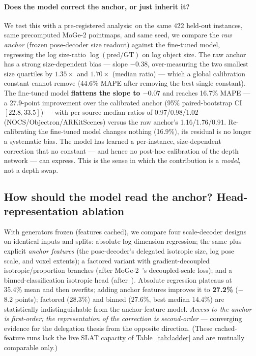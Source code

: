 \documentclass[runningheads]{llncs}
\begin{document}
\paragraph{Does the model correct the anchor, or just inherit it?}
We test this with a pre-registered analysis: on the same 422 held-out instances, same
precomputed MoGe-2 pointmaps, and same seed, we compare the \emph{raw anchor} (frozen
pose-decoder size readout) against the fine-tuned model, regressing the log size-ratio
$\log(\text{pred}/\text{GT})$ on log object size. The raw anchor has a strong
size-dependent bias --- slope $-0.38$, over-measuring the two smallest size quartiles by
$1.35\times$ and $1.70\times$ (median ratio) --- which a global calibration constant cannot
remove (44.6\% MAPE after removing the best single constant). The fine-tuned model
\textbf{flattens the slope to $-0.07$} and reaches 16.7\% MAPE --- a 27.9-point
improvement over the calibrated anchor (95\% paired-bootstrap CI $[22.8, 33.5]$) --- with
per-source median ratios of 0.97/0.98/1.02 (NOCS/Objectron/ARKitScenes) versus the raw
anchor's 1.16/1.76/0.91. Re-calibrating the fine-tuned model changes nothing (16.9\%),
\ie its residual is no longer a systematic bias. The model has learned a per-instance,
size-dependent correction that no constant --- and hence no post-hoc calibration of the
depth network --- can express. This is the sense in which the contribution is a
\emph{model}, not a depth swap.

\subsection{How should the model read the anchor? Head-representation ablation}
\label{sec:headablation}

With generators frozen (features cached), we compare four scale-decoder designs on
identical inputs and splits: absolute log-dimension regression; the same plus explicit
\emph{anchor features} (the pose-decoder's delegated isotropic size, log pose scale, and
voxel extents); a factored variant with gradient-decoupled isotropic/proportion branches
(after MoGe-2~\cite{moge2}'s decoupled-scale loss); and a binned-classification isotropic
head (after~\cite{omninocs}). Absolute regression plateaus at 35.4\% mean and then
overfits; adding anchor features improves it to \textbf{27.2\%} ($-$8.2 points); factored
(28.3\%) and binned (27.6\%, best median 14.4\%) are statistically indistinguishable from
the anchor-feature model. \emph{Access to the anchor is first-order; the representation of
the correction is second-order} --- converging evidence for the delegation thesis from the
opposite direction. (These cached-feature runs lack the live SLAT capacity of
Table~\ref{tab:ladder} and are mutually comparable only.)
\end{document}
